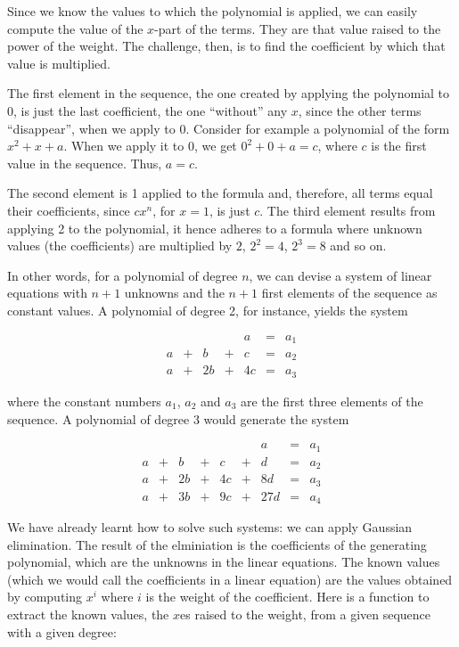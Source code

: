 \documentclass[tikz]{scrreprt}
\begin{document}
Since we know the values to which the polynomial is applied,
we can easily compute the value of the $x$-part of the terms.
They are that value raised to the power of the weight.
The challenge, then, is to find the coefficient by which
that value is multiplied.

The first element in the sequence, the one created by applying
the polynomial to 0, is just the last coefficient,
the one ``without'' any $x$, since the other terms ``disappear'',
when we apply to 0. Consider for example a polynomial of the form
$x^2 + x + a$. When we apply it to 0,
we get $0^2 + 0 + a = c$, where $c$ is the first
value in the sequence. Thus, $a=c$.

The second element is 1 applied to the formula and, therefore,
all terms equal their coefficients, since $cx^n$, for $x=1$, 
is just $c$. The third element results from applying 2 to the polynomial,
it hence adheres to a formula where unknown values (the coefficients)
are multiplied by $2$, $2^2=4$, $2^3=8$ and so on.

In other words, for a polynomial of degree $n$, we can devise
a system of linear equations with $n+1$ unknowns and
the $n+1$ first elements of the sequence as constant values.
A polynomial of degree 2, for instance, yields the system

\begin{equation}
\begin{array}{rcrcrcr}
    &   &    &   & a  & = &  a_1 \\
  a & + & b  & + & c  & = &  a_2 \\
  a & + & 2b & + & 4c & = &  a_3
\end{array}
\end{equation}

where the constant numbers $a_1$, $a_2$ and $a_3$
are the first three elements of the sequence.
A polynomial of degree 3 would generate the system

\begin{equation}
\begin{array}{rcrcrcrcr}
    &   &    &   &    &   &   a & = &  a_1 \\
  a & + &  b & + &  c & + &   d & = &  a_2 \\
  a & + & 2b & + & 4c & + &  8d & = &  a_3 \\
  a & + & 3b & + & 9c & + & 27d & = &  a_4 
\end{array}
\end{equation}

We have already learnt how to solve such systems:
we can apply Gaussian elimination.
The result of the elminiation is 
the coefficients of the generating polynomial,
which are the unknowns in the linear equations.
The known values (which we would call the coefficients
in a linear equation) are the values obtained
by computing $x^i$ where $i$ is the weight 
of the coefficient.
Here is a function to extract the known values,
the $x$es raised to the weight, from a given 
sequence with a given degree:
\end{document}
